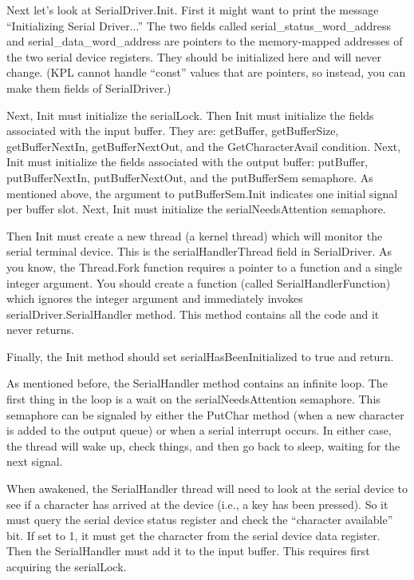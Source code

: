 \documentclass[11pt]{article}
\begin{document}
Next let's look at SerialDriver.Init.  First it might want to print
the message ``Initializing Serial Driver...''  The two fields called
serial\_status\_word\_address and serial\_data\_word\_address are pointers
to the memory-mapped addresses of the two serial device registers.
They should be initialized here and will never change.  (KPL cannot
handle ``const'' values that are pointers, so instead, you can make them
fields of SerialDriver.)

Next, Init must initialize the serialLock.  Then Init must initialize
the fields associated with the input buffer.  They are: getBuffer,
getBufferSize, getBufferNextIn, getBufferNextOut, and the
GetCharacterAvail condition.  Next, Init must initialize the fields
associated with the output buffer: putBuffer, putBufferNextIn,
putBufferNextOut, and the putBufferSem semaphore.  As mentioned above,
the argument to putBufferSem.Init indicates one initial signal per
buffer slot.  Next, Init must initialize the serialNeedsAttention
semaphore.

Then Init must create a new thread (a kernel thread) which will
monitor the serial terminal device.  This is the serialHandlerThread
field in SerialDriver.  As you know, the Thread.Fork function requires
a pointer to a function and a single integer argument.  You should
create a function (called SerialHandlerFunction) which ignores the
integer argument and immediately invokes serialDriver.SerialHandler
method.  This method contains all the code and it never returns.

Finally, the Init method should set serialHasBeenInitialized to true
and return.

As mentioned before, the SerialHandler method contains an infinite
loop.  The first thing in the loop is a wait on the
serialNeedsAttention semaphore.  This semaphore can be signaled by
either the PutChar method (when a new character is added to the output
queue) or when a serial interrupt occurs.  In either case, the thread
will wake up, check things, and then go back to sleep, waiting for the
next signal.

When awakened, the SerialHandler thread will need to look at the
serial device to see if a character has arrived at the device (i.e., a
key has been pressed).  So it must query the serial device status
register and check the ``character available'' bit.  If set to 1, it
must get the character from the serial device data register.  Then the
SerialHandler must add it to the input buffer.  This requires first
acquiring the serialLock.
\end{document}
